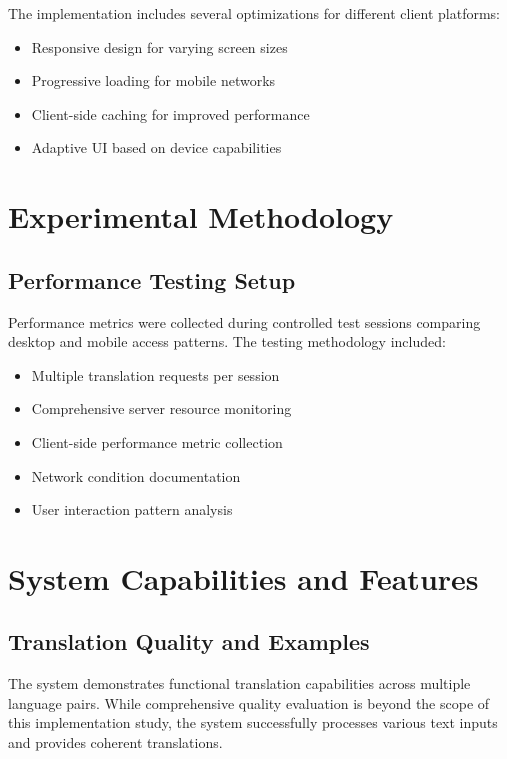 \documentclass[conference]{IEEEtran}
\begin{document}
The implementation includes several optimizations for different client platforms:

\begin{itemize}
    \item Responsive design for varying screen sizes
    \item Progressive loading for mobile networks
    \item Client-side caching for improved performance
    \item Adaptive UI based on device capabilities
\end{itemize}

\section{Experimental Methodology}

\subsection{Performance Testing Setup}

Performance metrics were collected during controlled test sessions comparing desktop and mobile access patterns. The testing methodology included:

\begin{itemize}
    \item Multiple translation requests per session
    \item Comprehensive server resource monitoring
    \item Client-side performance metric collection
    \item Network condition documentation
    \item User interaction pattern analysis
\end{itemize}

\section{System Capabilities and Features}

\subsection{Translation Quality and Examples}

The system demonstrates functional translation capabilities across multiple language pairs. While comprehensive quality evaluation is beyond the scope of this implementation study, the system successfully processes various text inputs and provides coherent translations.
\end{document}
